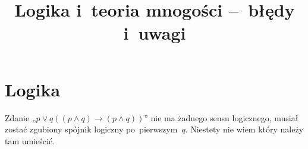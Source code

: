 \documentclass[a4paper,11pt]{article}
\title{Logika i~teoria mnogości --~błędy i~uwagi}
\begin{document}



\maketitle  %



\section{Logika}

\vspace{\spaceTwo}






\start {} Zdanie
„$p \vee q ( ( p \land q ) \to ( p \land q ) )$” nie ma żadnego sensu
logicznego, musiał zostać zgubiony spójnik logiczny po~pierwszym~$q$.
Niestety nie wiem który należy tam umieścić.



\end{document}
